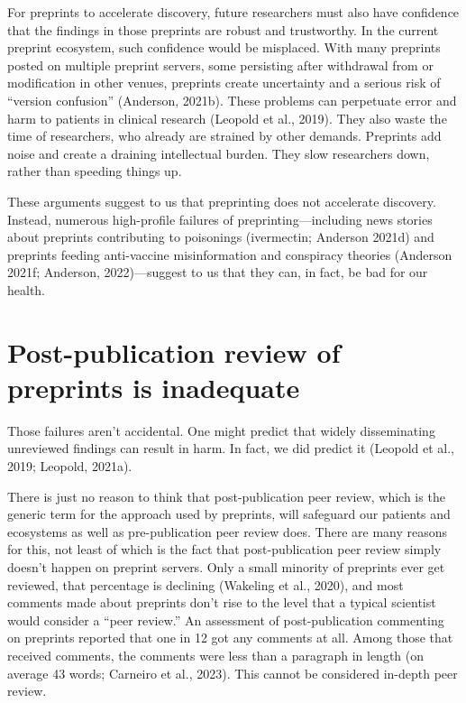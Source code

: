 \documentclass[authordate, empirical]{jote-new-article}
\begin{document}
	For preprints to accelerate discovery, future researchers must also have confidence that the findings in those preprints are robust and trustworthy. In the current preprint ecosystem, such confidence would be misplaced. With many preprints posted on multiple preprint servers, some persisting after withdrawal from or modification in other venues, preprints create uncertainty and a serious risk of “version confusion” (Anderson, 2021b). These problems can perpetuate error and harm to patients in clinical research (Leopold et al., 2019). They also waste the time of researchers, who already are strained by other demands. Preprints add noise and create a draining intellectual burden. They slow researchers down, rather than speeding things up.







	These arguments suggest to us that preprinting does not accelerate discovery. Instead, numerous high-profile failures of preprinting—including news stories about preprints contributing to poisonings (ivermectin; Anderson 2021d) and preprints feeding anti-vaccine misinformation and conspiracy theories (Anderson 2021f; Anderson,\textbf{ }2022)—suggest to us that they can, in fact, be bad for our health.







	\section{Post-publication review of preprints is inadequate}







	Those failures aren't accidental. One might predict that widely disseminating unreviewed findings can result in harm. In fact, we did predict it (Leopold et al., 2019; Leopold, 2021a).







	There is just no reason to think that post-publication peer review, which is the generic term for the approach used by preprints, will safeguard our patients and ecosystems as well as pre-publication peer review does. There are many reasons for this, not least of which is the fact that post-publication peer review simply doesn't happen on preprint servers. Only a small minority of preprints ever get reviewed, that percentage is declining (Wakeling et al., 2020), and most comments made about preprints don't rise to the level that a typical scientist would consider a “peer review.” An assessment of post-publication commenting on preprints reported that one in 12 got any comments at all. Among those that received comments, the comments were less than a paragraph in length (on average 43 words; Carneiro et al., 2023). This cannot be considered in-depth peer review.
\end{document}
